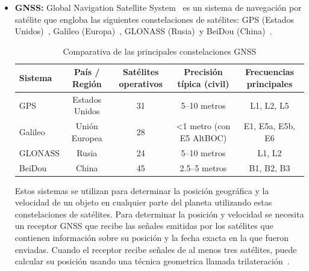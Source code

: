 \begin{itemize}
    \item \textbf{GNSS:} Global Navigation Satellite System~\cite{inertiallabs_gnss} es un sistema de navegación por satélite que engloba las siguientes constelaciones de satélites:
    GPS (Estados Unidos)~\cite{gps_system}, Galileo (Europa)~\cite{galileo_system}, GLONASS (Rusia)~\cite{glonass_system}y BeiDou (China)~\cite{beidou_system}.
    \begin{table}[h]
        \centering
        \footnotesize
        \begin{tabular}{|l|c|c|c|c|}
            \hline
            \textbf{Sistema} & \textbf{País / Región} & \textbf{Satélites operativos} & \textbf{Precisión típica (civil)} & \textbf{Frecuencias principales} \\
            \hline
            GPS              & Estados Unidos         & 31                            & 5–10 metros                       & L1, L2, L5                       \\
            \hline
            Galileo          & Unión Europea          & 28                            & <1 metro (con E5 AltBOC)          & E1, E5a, E5b, E6                 \\
            \hline
            GLONASS          & Rusia                  & 24                            & 5–10 metros                       & L1, L2                           \\
            \hline
            BeiDou           & China                  & 45                            & 2.5–5 metros                      & B1, B2, B3                       \\
            \hline
        \end{tabular}
        \caption{Comparativa de las principales constelaciones GNSS}
        \label{tab:gnss_constellations}
    \end{table}


    Estos sistemas se utilizan para determinar la posición geográfica y la velocidad de un objeto en cualquier parte del planeta utilizando estas constelaciones de satélites.
    Para determinar la posición y velocidad se necesita un receptor GNSS que recibe las señales emitidas por los satélites que contienen información sobre su posición y la fecha exacta en la que fueron enviadas.
    Cuando el receptor recibe señales de al menos tres satélites, puede calcular su posición usando una técnica geometrica llamada trilateración~\cite{trilateracion}.


\end{itemize}
